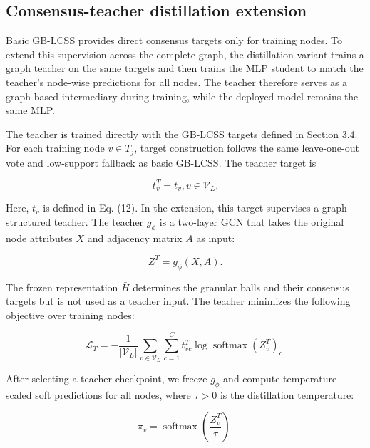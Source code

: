 \documentclass[preprint,12pt]{elsarticle}
\begin{document}
\subsection{Consensus-teacher distillation extension}\label{sec:3.5}

Basic GB-LCSS provides direct consensus targets only for training nodes. To extend this supervision across the complete graph, the distillation variant trains a graph teacher on the same targets and then trains the MLP student to match the teacher's node-wise predictions for all nodes. The teacher therefore serves as a graph-based intermediary during training, while the deployed model remains the same MLP.

The teacher is trained directly with the GB-LCSS targets defined in Section 3.4. For each training node \(v \in T_{j}\), target construction follows the same leave-one-out vote and low-support fallback as basic GB-LCSS. The teacher target is

\begin{equation}\label{eq:14}
t_{v}^{T} = t_{v},v \in \mathcal{V}_{L}.
\end{equation}

Here, \(t_{v}\) is defined in Eq. (12). In the extension, this target supervises a graph-structured teacher. The teacher \(g_{\phi}\) is a two-layer GCN that takes the original node attributes \(X\) and adjacency matrix \(A\) as input:

\begin{equation}\label{eq:15}
Z^{T} = g_{\phi}(X,A).
\end{equation}

The frozen representation \(\bar{H}\) determines the granular balls and their consensus targets but is not used as a teacher input. The teacher minimizes the following objective over training nodes:

\begin{equation}\label{eq:16}
\mathcal{L}_{T} = - \frac{1}{|\mathcal{V}_{L}|}\sum_{v \in \mathcal{V}_{L}}{\sum_{c = 1}^{C}t_{vc}^{T}}\log\operatorname{softmax}\left( Z_{v}^{T} \right)_{c}.
\end{equation}

After selecting a teacher checkpoint, we freeze \(g_{\phi}\) and compute temperature-scaled soft predictions for all nodes, where \(\tau > 0\) is the distillation temperature:

\begin{equation}\label{eq:17}
\pi_{v} = \operatorname{softmax}\left( \frac{Z_{v}^{T}}{\tau} \right).
\end{equation}
\end{document}
